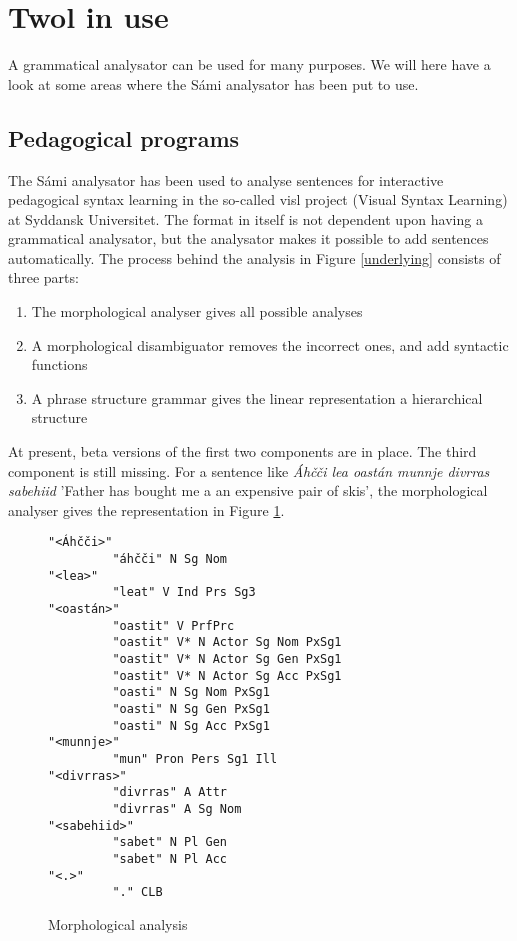 \documentclass[a4paper,english]{article}
\begin{document}
\section{Twol in use}

A grammatical analysator can be used for many purposes. We will here have a look at some areas where the Sámi analysator has been put to use.

\subsection{Pedagogical programs}\label{ped}

The Sámi analysator has been used to analyse sentences for interactive pedagogical syntax learning in the so-called visl project (Visual Syntax Learning) at Syddansk Universitet. The format in itself is not dependent upon having a grammatical analysator, but the analysator makes it possible to add sentences automatically. The process behind the analysis in Figure \ref{underlying} consists of three parts:

\begin{enumerate}
\item The morphological analyser gives all possible analyses
\item A morphological disambiguator removes the incorrect ones, and add syntactic functions
\item A phrase structure grammar gives the linear representation a hierarchical structure
\end{enumerate}

At present, beta versions of the first two components are in place. The third component is still missing.
For a sentence like \textit{Áhčči lea oastán munnje divrras sabehiid} 'Father has bought me a an expensive pair of skis', the morphological analyser gives the representation in Figure \ref{fatherall}.

\begin{figure}[htdp]
\caption{Morphological analysis}
\begin{center}
\begin{verbatim}
"<Áhčči>"
         "áhčči" N Sg Nom
"<lea>"
         "leat" V Ind Prs Sg3
"<oastán>"
         "oastit" V PrfPrc
         "oastit" V* N Actor Sg Nom PxSg1
         "oastit" V* N Actor Sg Gen PxSg1
         "oastit" V* N Actor Sg Acc PxSg1
         "oasti" N Sg Nom PxSg1
         "oasti" N Sg Gen PxSg1
         "oasti" N Sg Acc PxSg1
"<munnje>"
         "mun" Pron Pers Sg1 Ill
"<divrras>"
         "divrras" A Attr
         "divrras" A Sg Nom
"<sabehiid>"
         "sabet" N Pl Gen
         "sabet" N Pl Acc
"<.>"
         "." CLB
\end{verbatim}
\end{center}
\label{fatherall}
\end{figure}%
\end{document}
